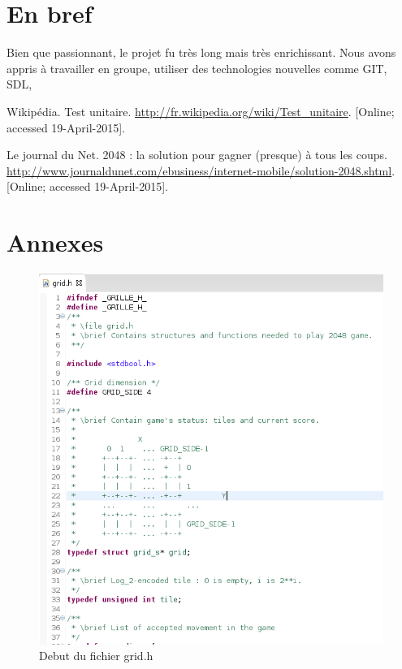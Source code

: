 \documentclass[12pt]{article}
\begin{document}
\newpage
\section{En bref}
Bien que passionnant, le projet fu tr\`es long mais tr\`es enrichissant. Nous
avons appris \`a travailler en groupe, utiliser des technologies nouvelles comme
GIT, SDL, 
\newpage

\begin{thebibliography}{1}
   Wikip\'edia. Test unitaire.
  \url{http://fr.wikipedia.org/wiki/Test_unitaire}. [Online; accessed
  19-April-2015].

   Le journal du Net. 2048 : la solution pour gagner (presque) à
  tous les coups.
  \url{http://www.journaldunet.com/ebusiness/internet-mobile/solution-2048.shtml}. [Online; accessed 19-April-2015].
\end{thebibliography}

\newpage
\section{Annexes}
\listoffigures
\begin{figure}
   \caption{\label{grid_h} Debut du fichier grid.h}
   \includegraphics[scale=0.6]{grid_h.png}
\end{figure}
\end{document}
